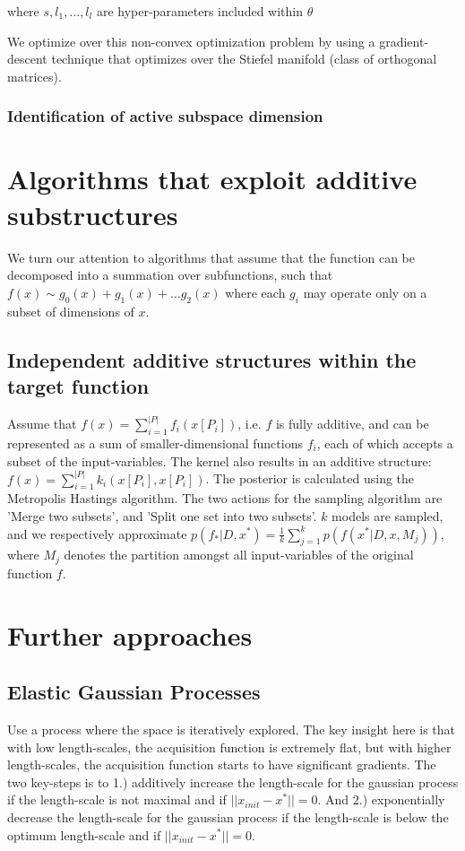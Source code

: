 where $s, l_1, \ldots, l_l $ are hyper-parameters included within $\theta$

We optimize over this non-convex optimization problem by using a gradient-descent technique that optimizes over the Stiefel manifold (class of orthogonal matrices).



\subsubsection{Identification of active subspace dimension }



\section{Algorithms that exploit additive substructures}

We turn our attention to algorithms that assume that the function can be decomposed into a summation over subfunctions, such that
$ f(x) \sim g_0(x) + g_1(x) + \ldots g_2(x) $ where each $g_i$ may operate only on a subset of dimensions of $x$.

\subsection{Independent additive structures within the target function}
\citep{Gardner2017} Assume that $f(x) = \sum_{i=1}^{ |P| } f_i (x[P_i] )$, i.e. $f$ is fully additive, and can be represented as a sum of smaller-dimensional functions $f_i$, each of which accepts a subset of the input-variables.
The kernel also results in an additive structure: $f(x) = \sum_{i=1}^{ |P| } k_i (x[P_i], x[P_i])$.
The posterior is calculated using the Metropolis Hastings algorithm.
The two actions for the sampling algorithm are 'Merge two subsets', and 'Split one set into two subsets'.
$k$ models are sampled, and we respectively approximate $p(f_* | D, x^*) = \frac{1}{k} \sum_{j=1}^{k} p( f(x^* | D, x, M_j) )$, where $M_j$ denotes the partition amongst all input-variables of the original function $f$.

\section{Further approaches}

\subsection{Elastic Gaussian Processes}
\citep{Rana2017} Use a process where the space is iteratively explored.
The key insight here is that with low length-scales, the acquisition function is extremely flat, but with higher length-scales, the acquisition function starts to have significant gradients.
The two key-steps is to 1.) additively increase the length-scale for the gaussian process if the length-scale is not maximal and if $|| x_{init} - x^* || = 0$.
And 2.) exponentially decrease the length-scale for the gaussian process if the length-scale is below the optimum length-scale and if $|| x_{init} - x^* || = 0$.


